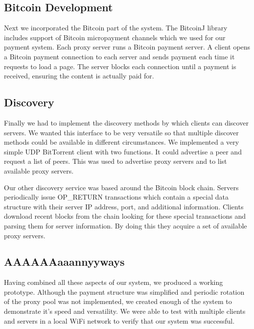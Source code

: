 \subsection{Bitcoin Development}
Next we incorporated the Bitcoin part of the system. The BitcoinJ library includes support of Bitcoin micropayment channels which we used for our payment system. Each proxy server runs a Bitcoin payment server. A client opens a Bitcoin payment connection to each server and sends payment each time it requests to load a page. The server blocks each connection until a payment is received, ensuring the content is actually paid for.

\subsection{Discovery}
Finally we had to implement the discovery methods by which clients can discover servers. We wanted this interface to be very versatile so that multiple discover methods could be available in different circumstances. We implemented a very simple UDP BitTorrent client with two functions. It could advertise a peer and request a list of peers. This was used to advertise proxy servers and to list available proxy servers.

Our other discovery service was based around the Bitcoin block chain. Servers periodically issue OP\_RETURN transactions which contain a special data structure with their server IP address, port, and additional information. Clients download recent blocks from the chain looking for these special transactions and parsing them for server information. By doing this they acquire a set of available proxy servers.

\subsection{AAAAAAaaannyyways}

Having combined all these aspects of our system, we produced a working prototype. Although the payment structure was simplified and periodic rotation of the proxy pool was not implemented, we created enough of the system to demonstrate it's speed and versatility. We were able to test with multiple clients and servers in a local WiFi network to verify that our system was successful.